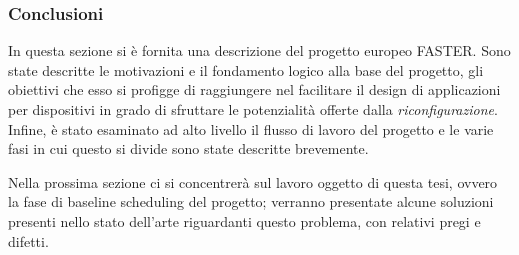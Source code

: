 \subsubsection{Conclusioni}
In questa sezione si è fornita una descrizione del progetto europeo 
\ac{FASTER}. Sono state descritte le motivazioni e il fondamento logico alla 
base del progetto, gli obiettivi che esso si profigge di raggiungere nel 
facilitare il design di applicazioni per dispositivi in grado di sfruttare le 
potenzialità offerte dalla \emph{riconfigurazione}. Infine, è stato esaminato 
ad alto livello il flusso di lavoro del progetto e le varie fasi in cui questo 
si divide sono state descritte brevemente.

Nella prossima sezione ci si concentrerà sul lavoro oggetto di questa tesi, 
ovvero la fase di baseline scheduling del progetto; verranno presentate alcune 
soluzioni presenti nello stato dell'arte riguardanti questo problema, con 
relativi pregi e difetti.
